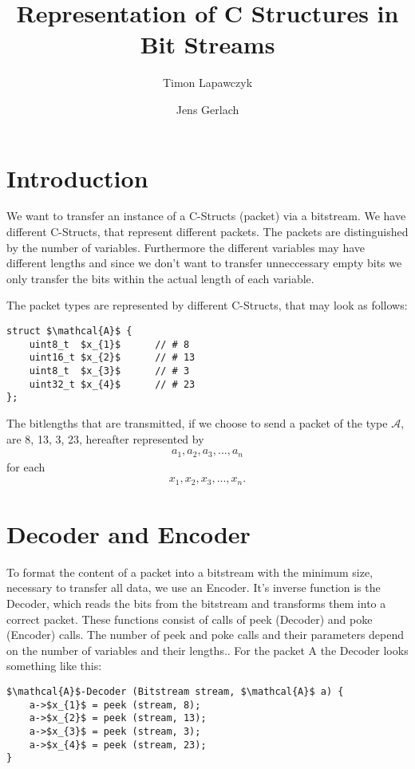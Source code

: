 \documentclass[paper=a4,DIV=12]{scrartcl}
\title{Representation of C Structures in Bit Streams}
\author{Timon Lapawczyk \and Jens Gerlach}
\begin{document}
\maketitle

\section{Introduction}
We want to transfer an instance of a C-Structs (packet) via a bitstream.
We have different C-Structs, that represent different packets.
The packets are distinguished by the number of variables.
Furthermore the different variables may have different lengths and
since we don't want to transfer unneccessary empty bits we only transfer
the bits within the actual length of each variable.

The packet types are represented by different C-Structs, that may look as follows:

\begin{lstlisting}[mathescape]
struct $\mathcal{A}$ {
	uint8_t  $x_{1}$      // # 8
	uint16_t $x_{2}$      // # 13
	uint8_t  $x_{3}$      // # 3
	uint32_t $x_{4}$      // # 23
};
\end{lstlisting}

		The bitlengths that are transmitted, if we choose to send a packet of the type $\mathcal{A}$, are 8, 13, 3, 23, hereafter represented by 
		\begin{align*}
			a_{1}, a_{2}, a_{3}, ... , a_{n}
		\end{align*}
		for each
		\begin{align*}
			x_{1}, x_{2}, x_{3}, ... , x_{n}.
		\end{align*}
	\section{Decoder and Encoder}
		To format the content of a packet into a bitstream with the minimum size, necessary to transfer all data, we use an Encoder. It's inverse function is the Decoder, which reads the bits
		from the bitstream and transforms them into a correct packet.
		These functions consist of calls of peek (Decoder) and poke (Encoder) calls. The number of peek and poke calls and their parameters depend on the number of variables and their lengths..
		For the packet A the Decoder looks something like this:
		\begin{lstlisting}[mathescape]
$\mathcal{A}$-Decoder (Bitstream stream, $\mathcal{A}$ a) {
	a->$x_{1}$ = peek (stream, 8);
	a->$x_{2}$ = peek (stream, 13);
	a->$x_{3}$ = peek (stream, 3);
	a->$x_{4}$ = peek (stream, 23);
}
		\end{lstlisting}
\end{document}
